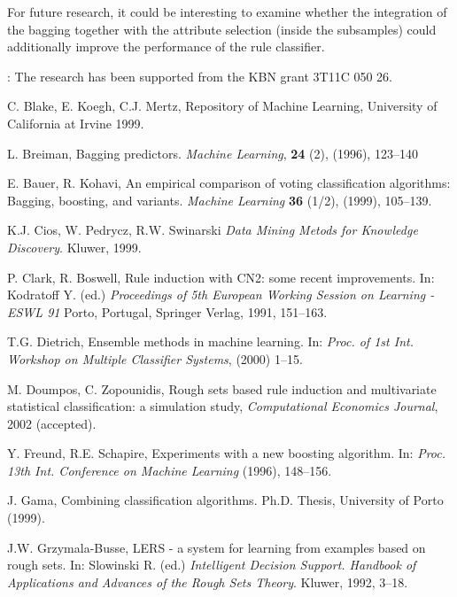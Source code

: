 \documentclass{elsart}
\begin{document}
For future research, it could be interesting to examine whether the
integration of the bagging together with the attribute selection (inside the
subsamples) could additionally improve the performance of the rule
classifier.



: The research has been supported from the KBN
grant 3T11C 050 26.

\begin{thebibliography}{17}

  C. Blake, E. Koegh, C.J. Mertz,
Repository of Machine Learning, University of California at Irvine 1999.

  L. Breiman,   Bagging predictors. {\em Machine Learning},
{\bf 24} (2), (1996), 123--140

  E. Bauer,  R. Kohavi, An empirical comparison of voting classification
algorithms: Bagging, boosting, and variants. {\em Machine Learning} {\bf 36}
(1/2), (1999),  105--139.

 K.J. Cios, W. Pedrycz, R.W. Swinarski {\em Data Mining
Metods for Knowledge Discovery}. Kluwer, 1999.

 P. Clark, R. Boswell, Rule induction with CN2: some recent
improvements. In: Kodratoff Y. (ed.) {\em Proceedings of 5th European
Working Session on Learning - ESWL 91} Porto, Portugal, Springer Verlag,
1991, 151--163.

 T.G. Dietrich, Ensemble methods in machine learning.
In: {\em Proc. of 1st Int. Workshop on Multiple Classifier Systems}, (2000)
1--15.

 M. Doumpos, C. Zopounidis, Rough sets based rule induction and multivariate
statistical classification: a simulation study, \emph{Computational
Economics Journal}, 2002 (accepted).

 Y. Freund, R.E. Schapire,  Experiments with a new boosting
algorithm. In: {\em Proc. 13th Int. Conference on Machine Learning} (1996),
148--156.

  J. Gama, Combining classification algorithms. Ph.D. Thesis,
University of Porto (1999).


 J.W.  Grzymala-Busse, LERS - a system for learning from
examples based on rough sets. In: Slowinski R. (ed.) {\it Intelligent
Decision Support. Handbook of Applications and Advances of the Rough Sets
Theory}. Kluwer, 1992, 3--18.



\end{thebibliography}
\end{document}
